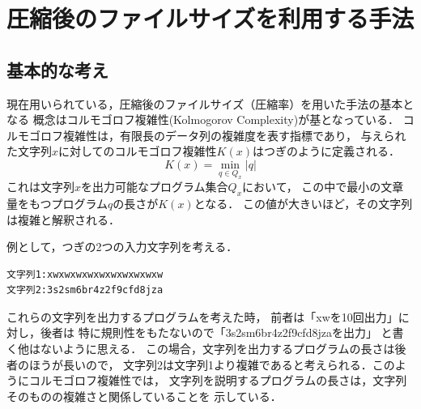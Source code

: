 \begin{table}[tb]%
\caption{単語を登録した後のLZW辞書．}
\label{lz2}
\begin{center}
\end{center}
\end{table}



\section{圧縮後のファイルサイズを利用する手法}
\subsection{基本的な考え}
現在用いられている，圧縮後のファイルサイズ（圧縮率）を用いた手法の基本となる
概念はコルモゴロフ複雑性(Kolmogorov Complexity)\cite{osamu2006}が基となっている．
コルモゴロフ複雑性は，有限長のデータ列の複雑度を表す指標であり，
与えられた文字列$x$に対してのコルモゴロフ複雑性$K(x)$はつぎのように定義される．
\begin{equation}
K(x) = \min_{q \in Q_x} |q| \label{kol}
\end{equation}
これは文字列$x$を出力可能なプログラム集合$Q_x$において，
この中で最小の文章量をもつプログラム$q$の長さが$K(x)$となる．
この値が大きいほど，その文字列は複雑と解釈される．

例として，つぎの2つの入力文字列を考える．
\begin{verbatim}
文字列1:xwxwxwxwxwxwxwxwxwxw
文字列2:3s2sm6br4z2f9cfd8jza
\end{verbatim}
これらの文字列を出力するプログラムを考えた時，
前者は「xwを10回出力」に対し，後者は
特に規則性をもたないので「3s2sm6br4z2f9cfd8jzaを出力」
と書く他はないように思える．
この場合，文字列を出力するプログラムの長さは後者のほうが長いので，
文字列2は文字列1より複雑であると考えられる．このようにコルモゴロフ複雑性では，
文字列を説明するプログラムの長さは，文字列そのものの複雑さと関係していることを
示している．

